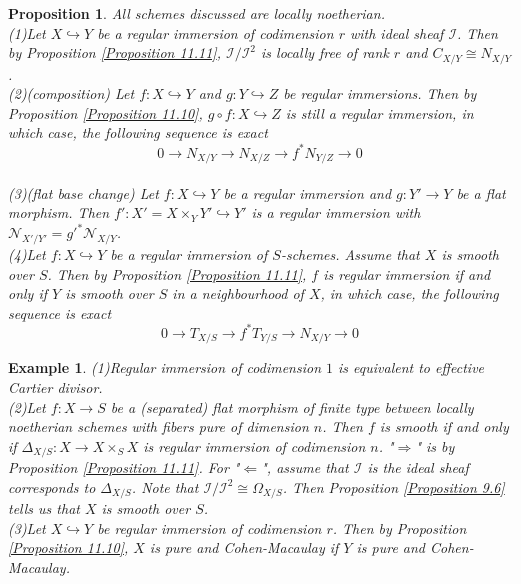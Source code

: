 \documentclass{ctexart}
\newtheorem{proposition}{Proposition}[section]
\newtheorem{example}{Example}[section]
\begin{document}
\begin{proposition}
    All schemes discussed are locally noetherian. \\
    (1)Let $X \hookrightarrow Y$ be a regular immersion of codimension $r$ with ideal sheaf $\mathcal{I}$.
    Then by Proposition \ref{Proposition 11.11}, $\mathcal{I}/\mathcal{I}^{2}$ is locally free of rank $r$ and $C_{X/Y} \cong N_{X/Y}$. \\
    (2)(composition) Let $f: X \hookrightarrow Y$ and $g: Y \hookrightarrow Z$ be regular immersions.
    Then by Proposition \ref{Proposition 11.10}, $g \circ f: X \hookrightarrow Z$ is still a regular immersion,
    in which case, the following sequence is exact
    \begin{equation*}
        0 \longrightarrow N_{X/Y} \longrightarrow N_{X/Z} \longrightarrow f^{\ast}N_{Y/Z} \longrightarrow 0
    \end{equation*} 
    \\
    (3)(flat base change) Let $f: X \hookrightarrow Y$ be a regular immersion and $g: Y' \longrightarrow Y$ be a flat morphism.
    Then $f': X' = X \times_{Y} Y' \hookrightarrow Y'$ is a regular immersion with $\mathcal{N}_{X'/Y'} = {g'}^{\ast}\mathcal{N}_{X/Y}$. \\
    (4)Let $f: X \hookrightarrow Y$ be a regular immersion of $S$-schemes.
    Assume that $X$ is smooth over $S$.
    Then by Proposition \ref{Proposition 11.11}, $f$ is regular immersion if and only if $Y$ is smooth over $S$ in a neighbourhood of $X$,
    in which case, the following sequence is exact
    \begin{equation*}
        0 \longrightarrow T_{X/S} \longrightarrow f^{\ast}T_{Y/S} \longrightarrow N_{X/Y} \longrightarrow 0
    \end{equation*} 
    \label{Proposition 11.13}
\end{proposition}
\begin{example}
    (1)Regular immersion of codimension $1$ is equivalent to effective Cartier divisor. \\
    (2)Let $f: X \longrightarrow S$ be a (separated) flat morphism of finite type between locally noetherian schemes with fibers pure of dimension $n$.
    Then $f$ is smooth if and only if $\Delta_{X/S}: X \longrightarrow X \times_{S} X$ is regular immersion of codimension $n$.
    "$\Rightarrow$" is by Proposition \ref{Proposition 11.11}.
    For "$\Leftarrow$", assume that $\mathcal{I}$ is the ideal sheaf corresponds to $\Delta_{X/S}$.
    Note that $\mathcal{I}/\mathcal{I}^{2} \cong \Omega_{X/S}$.
    Then Proposition \ref{Proposition 9.6} tells us that $X$ is smooth over $S$. \\
    (3)Let $X \hookrightarrow Y$ be regular immersion of codimension $r$.
    Then by Proposition \ref{Proposition 11.10}, $X$ is pure and Cohen-Macaulay if $Y$ is pure and Cohen-Macaulay.
\end{example}
\end{document}
